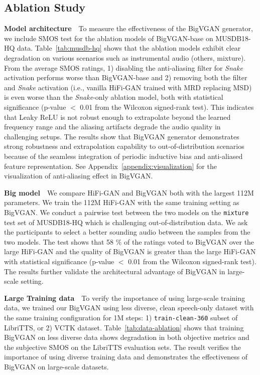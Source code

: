\documentclass{article} \usepackage{iclr2023_conference,times}
\theoremstyle{plain}
\theoremstyle{definition}
\theoremstyle{remark}
\begin{document}
\vspace{-.2cm}
\subsection{Ablation Study}
\vspace{-.1cm}
\textbf{Model architecture}~\ 
To measure the effectiveness of the BigVGAN generator, we include SMOS test for the ablation models of BigVGAN-base on MUSDB18-HQ data. Table~\ref{tab:musdb-hq} shows that the ablation models exhibit clear degradation on various  scenarios such as instrumental audio (others, mixture). From the average SMOS ratings, 1) disabling the anti-aliasing filter for \emph{Snake} activation performs worse than BigVGAN-base and 2) removing both the filter and \emph{Snake} activation (i.e., vanilla HiFi-GAN trained with MRD replacing MSD) is even worse than the \emph{Snake}-only ablation model, both with statistical significance (p-value $<$ 0.01 from the Wilcoxon signed-rank test). This indicates that Leaky ReLU is not robust enough to extrapolate beyond the learned frequency range and the aliasing artifacts degrade the audio quality in challenging setups. The results show that BigVGAN generator demonstrates strong robustness and extrapolation capability to out-of-distribution scenarios because of the seamless integration of periodic inductive bias and anti-aliased feature representation. See Appendix~\ref{appendix:visualization} for the visualization of anti-aliasing effect in BigVGAN.

\textbf{Big model}~\
We compare HiFi-GAN and BigVGAN both with the largest 112M parameters. We train the 112M HiFi-GAN with the same training setting as BigVGAN. We conduct a pairwise test between the two models on the \texttt{mixture} test set of MUSDB18-HQ which is challenging out-of-distribution data. We ask the participants to select a better sounding audio between the samples from the two models. The test shows that 58 $\%$ of the ratings voted to BigVGAN over the large HiFi-GAN and the quality of BigVGAN is greater than the large HiFi-GAN with statistical significance (p-value $<$ 0.01 from the Wilcoxon signed-rank test). The results further validate the architectural advantage of BigVGAN in large-scale setting. 

\textbf{Large Training data}~\ 
To verify the importance of using large-scale training data, we trained our BigVGAN using less diverse, clean speech-only dataset with the same training configuration for 1M steps: 1) \texttt{train-clean-360} subset of LibriTTS, or 2) VCTK dataset. Table~\ref{tab:data-ablation} shows that training BigVGAN on less diverse data shows degradation in both objective metrics and the subjective SMOS on the LibriTTS evaluation sets. The result verifies the importance of using diverse training data and demonstrates the effectiveness of BigVGAN on large-scale datasets.
\end{document}
